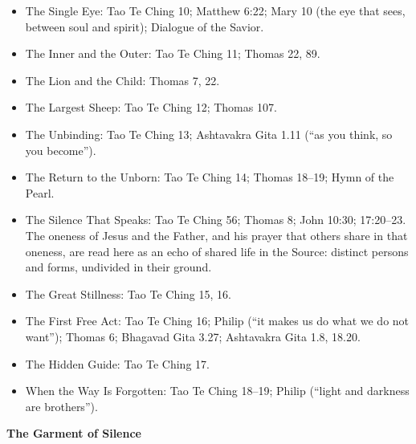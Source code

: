 \documentclass[10pt, openright]{book}
\providecommand{\tightlist}{\setlength{\itemsep}{0pt}\setlength{\parskip}{0pt}}
\begin{document}
\begin{itemize}
\tightlist
\item
  The Single Eye: Tao Te Ching 10; Matthew 6:22; Mary 10 (the eye that
  sees, between soul and spirit); Dialogue of the Savior.
\item
  The Inner and the Outer: Tao Te Ching 11; Thomas 22, 89.
\item
  The Lion and the Child: Thomas 7, 22.
\item
  The Largest Sheep: Tao Te Ching 12; Thomas 107.
\item
  The Unbinding: Tao Te Ching 13; Ashtavakra Gita 1.11 (``as you think,
  so you become'').
\item
  The Return to the Unborn: Tao Te Ching 14; Thomas 18--19; Hymn of the
  Pearl.
\item
  The Silence That Speaks: Tao Te Ching 56; Thomas 8; John 10:30;
  17:20--23. The oneness of Jesus and the Father, and his prayer that
  others share in that oneness, are read here as an echo of shared life
  in the Source: distinct persons and forms, undivided in their ground.
\item
  The Great Stillness: Tao Te Ching 15, 16.
\item
  The First Free Act: Tao Te Ching 16; Philip (``it makes us do what we
  do not want''); Thomas 6; Bhagavad Gita 3.27; Ashtavakra Gita 1.8,
  18.20.
\item
  The Hidden Guide: Tao Te Ching 17.
\item
  When the Way Is Forgotten: Tao Te Ching 18--19; Philip (``light and
  darkness are brothers'').
\end{itemize}

\textbf{The Garment of Silence}
\end{document}
